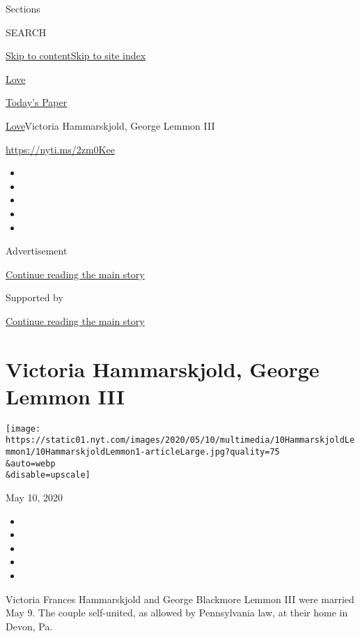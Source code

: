 Sections

SEARCH

\protect\hyperlink{site-content}{Skip to
content}\protect\hyperlink{site-index}{Skip to site index}

\href{https://www.nytimes.com/section/fashion/weddings}{Love}

\href{https://myaccount.nytimes.com/auth/login?response_type=cookie\&client_id=vi}{}

\href{https://www.nytimes.com/section/todayspaper}{Today's Paper}

\href{/section/fashion/weddings}{Love}\textbar{}Victoria Hammarskjold,
George Lemmon III

\url{https://nyti.ms/2zm0Kee}

\begin{itemize}
\item
\item
\item
\item
\item
\end{itemize}

Advertisement

\protect\hyperlink{after-top}{Continue reading the main story}

Supported by

\protect\hyperlink{after-sponsor}{Continue reading the main story}

\hypertarget{victoria-hammarskjold-george-lemmon-iii}{%
\section{Victoria Hammarskjold, George Lemmon
III}\label{victoria-hammarskjold-george-lemmon-iii}}

\texttt{[image: https://static01.nyt.com/images/2020/05/10/multimedia/10HammarskjoldLemmon1/10HammarskjoldLemmon1-articleLarge.jpg?quality=75\\\&auto=webp\\\&disable=upscale]}

May 10, 2020

\begin{itemize}
\item
\item
\item
\item
\item
\end{itemize}

Victoria Frances Hammarskjold and George Blackmore Lemmon III were
married May 9. The couple self-united, as allowed by Pennsylvania law,
at their home in Devon, Pa.

